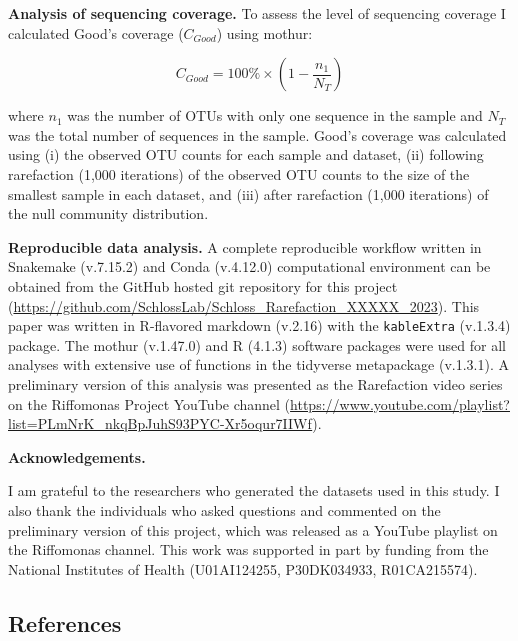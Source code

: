 \documentclass[
]{article}
\begin{document}
\textbf{Analysis of sequencing coverage.} To assess the level of
sequencing coverage I calculated Good's coverage (\(C_{Good}\)) using
mothur:

\[C_{Good} = 100\% \times \left(1-\frac{n_1}{N_T} \right)\]

where \(n_1\) was the number of OTUs with only one sequence in the
sample and \(N_T\) was the total number of sequences in the sample.
Good's coverage was calculated using (i) the observed OTU counts for
each sample and dataset, (ii) following rarefaction (1,000 iterations)
of the observed OTU counts to the size of the smallest sample in each
dataset, and (iii) after rarefaction (1,000 iterations) of the null
community distribution.

\textbf{Reproducible data analysis.} A complete reproducible workflow
written in Snakemake (v.7.15.2) and Conda (v.4.12.0) computational
environment can be obtained from the GitHub hosted git repository for
this project
(\url{https://github.com/SchlossLab/Schloss_Rarefaction_XXXXX_2023}).
This paper was written in R-flavored markdown (v.2.16) with the
\texttt{kableExtra} (v.1.3.4) package. The mothur (v.1.47.0) and R
(4.1.3) software packages were used for all analyses with extensive use
of functions in the tidyverse metapackage (v.1.3.1). A preliminary
version of this analysis was presented as the Rarefaction video series
on the Riffomonas Project YouTube channel
(\url{https://www.youtube.com/playlist?list=PLmNrK_nkqBpJuhS93PYC-Xr5oqur7IIWf}).

\vspace{10mm}

\textbf{Acknowledgements.}

I am grateful to the researchers who generated the datasets used in this
study. I also thank the individuals who asked questions and commented on
the preliminary version of this project, which was released as a YouTube
playlist on the Riffomonas channel. This work was supported in part by
funding from the National Institutes of Health (U01AI124255,
P30DK034933, R01CA215574).

\newpage

\hypertarget{references}{%
\subsection{References}\label{references}}

\setlength{\parindent}{-0.25in}
\setlength{\leftskip}{0.25in}

\noindent
\end{document}
